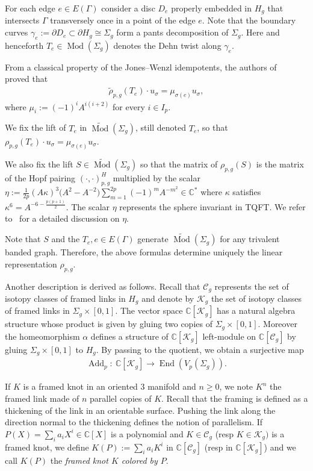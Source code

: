 \documentclass[11pt]{article}
\newcommand{\End}{\operatorname{End}}
\newcommand{\Mod}{\operatorname{Mod}}
\newcommand{\Add}{\operatorname{Add}}
\newcommand{\mcg}{\Mod(\Sigma_g)}
\newcommand{\emcg}{\widetilde{\Mod}(\Sigma_g)}
\newcommand{\muu}[1]{\mu_{#1}}
\numberwithin{equation}{section}
\begin{document}
For each edge $e\in E(\Gamma)$ consider a disc $D_e$ properly embedded in $H_g$ that intersects $\Gamma$ transversely once in a point of the edge $e$. Note that the boundary curves $\gamma_e := \partial D_e \subset \partial H_g \cong \Sigma_g$ form a pants decomposition of $\Sigma_g$. Here and henceforth $T_e\in \mcg$ denotes the Dehn twist along $\gamma_e$.

From a classical property of the Jones--Wenzl idempotents, the authors of~\cite{BHMV2} proved that
\begin{gather*} \tilde{\rho}_{p,g}(T_e) \cdot u_{\sigma} = \muu{\sigma(e)} u_{\sigma}, \end{gather*}
where $\muu{i} := (-1)^i A^{i(i+2)}$ for every $i\in I_p$.

We fix the lift of $T_e$ in $\emcg$, still denoted $T_e$, so that $ \rho_{p,g}(T_e) \cdot u_{\sigma} = \muu{\sigma(e)} u_{\sigma}$.

We also fix the lift $S\in\emcg$ so that the matrix of $\rho_{p,g}(S)$ is the matrix of the Hopf pairing $(\cdot, \cdot )^H_{p,g}$ multiplied by the scalar $\eta:=\frac{1}{2p}(A\kappa)^3\big(A^2-A^{-2}\big)\sum\limits_{m=1}^{2p}{(-1)^mA^{-m^2}}\in \mathbb{C}^*$ where $\kappa$ satisfies $\kappa^6=A^{-6-\frac{p(p+1)}{2}}$. The scalar $\eta$ represents the sphere invariant in TQFT. We refer to~\cite{BHMV2} for a detailed discussion on $\eta$.

 Note that $S$ and the $ T_e, e\in E(\Gamma)$ generate $\emcg$ for any trivalent banded graph. Therefore, the above formulas determine uniquely the linear representation $\rho_{p,g}$.

Another description is derived as follows. Recall that $\mathcal{C}_g$ represents the set of isotopy classes of framed links in $H_g$ and denote by $\mathcal{K}_g$ the set of isotopy classes of framed links in $\Sigma_g\times [0,1]$. The vector space $\mathbb{C}[\mathcal{K}_g]$ has a natural algebra structure whose product is given by gluing two copies of $\Sigma_g\times[0,1]$. Moreover the homeomorphism $\alpha$ defines a structure of $\mathbb{C}[\mathcal{K}_g]$ left-module on $\mathbb{C}[\mathcal{C}_g]$ by gluing $\Sigma_g\times[0,1]$ to $H_g$. By passing to the quotient, we obtain a surjective map
\begin{gather*} \Add_p \colon \ \mathbb{C}[\mathcal{K}_g] \rightarrow \End(V_p(\Sigma_g)).\end{gather*}

If $K$ is a framed knot in an oriented $3$ manifold and $n\geq 0$, we note $K^n$ the framed link made of $n$ parallel copies of $K$. Recall that the framing is defined as a thickening of the link in an orientable surface. Pushing the link along the direction normal to the thickening defines the notion of parallelism. If $P(X)=\sum_i a_i X^i \in \mathbb{C}[X]$ is a polynomial and $K\in \mathcal{C}_g$ (resp $K\in \mathcal{K}_g)$ is a framed knot, we define $K(P):=\sum_i a_i K^i $ in $\mathbb{C}[\mathcal{C}_g]$ (resp in $\mathbb{C}[\mathcal{K}_g]$) and we call $K(P)$ the \textit{framed knot $K$ colored by $P$}.
\end{document}
